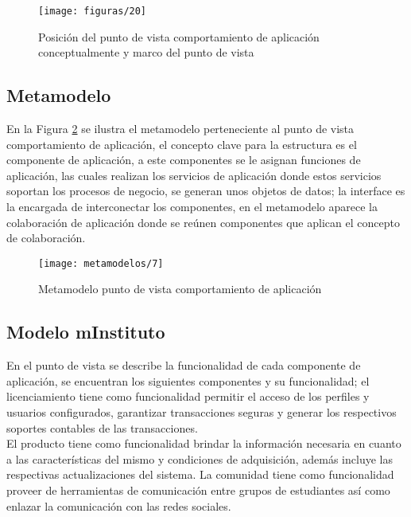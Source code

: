   \begin{figure}[H]
	\centering
	\texttt{[image: figuras/20]}
	\captionsetup{width=.95\textwidth}
	\caption{Posición del punto de vista comportamiento de aplicación conceptualmente y marco del punto de vista \cite{ref9}}
	\label{figura20}
  \end{figure}

\subsection{Metamodelo}
En la Figura \ref{metamodelo7} se ilustra el metamodelo perteneciente al punto de vista comportamiento de aplicación, el concepto clave para la estructura es el componente de aplicación, a este componentes se le asignan funciones de aplicación, las cuales realizan los servicios de aplicación donde estos servicios soportan los procesos de negocio, se generan unos objetos de datos; la interface es la encargada de interconectar los componentes, en el metamodelo aparece la colaboración de aplicación donde se reúnen componentes que aplican el concepto de colaboración. \cite{ref9}

\begin{figure}[H]
	\centering
	\texttt{[image: metamodelos/7]}
	\captionsetup{width=.95\textwidth}
	\caption{Metamodelo punto de vista comportamiento de aplicación \cite{ref9}}
	\label{metamodelo7}
\end{figure}

  \subsection{Modelo mInstituto}
  En el punto de vista se describe la funcionalidad de cada componente de aplicación, se encuentran los siguientes componentes y su funcionalidad; el licenciamiento tiene como funcionalidad permitir el acceso de los perfiles y usuarios configurados, garantizar transacciones seguras y generar los respectivos soportes contables de las transacciones. \\
  
  El producto tiene como funcionalidad brindar la información necesaria en cuanto a las características del mismo y condiciones de adquisición, además incluye las respectivas actualizaciones del sistema. La comunidad tiene como funcionalidad proveer de herramientas de comunicación entre grupos de estudiantes así como enlazar la comunicación con las redes sociales. \\
  
